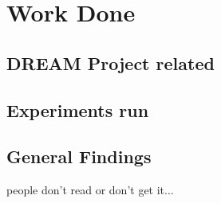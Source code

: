 \chapter{Work Done}

\section{DREAM Project related}

\section{Experiments run}


\section{General Findings}

people don't read or don't get it...